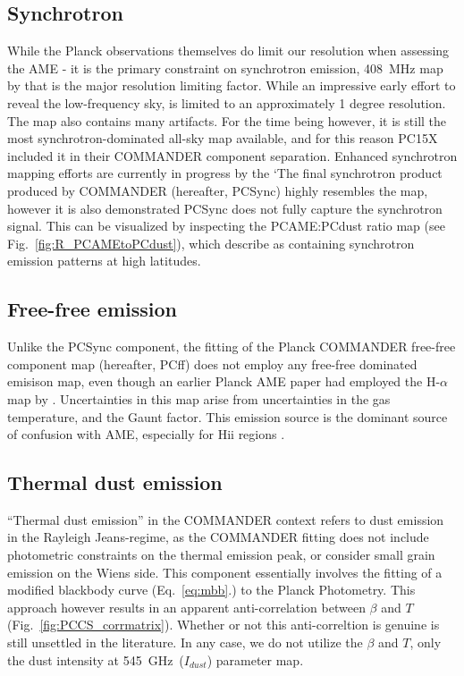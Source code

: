        \subsection{Synchrotron}
        While the Planck observations themselves do limit our resolution when assessing the AME - it is the primary constraint on synchrotron emission, 408~MHz map by \cite{haslam82} that is the major resolution limiting factor. While an impressive early effort to reveal the low-frequency sky, \citep{haslam82} is limited to an approximately 1 degree resolution. The map also contains many artifacts. For the time being however, it is still the most synchrotron-dominated all-sky map available, and for this reason PC15X included it in their COMMANDER component separation. Enhanced synchrotron mapping efforts are currently in progress by the `The final synchrotron product produced by COMMANDER (hereafter, PCSync) highly resembles the \cite{haslam82} map, however it is also demonstrated PCSync does not fully capture the synchrotron signal. This can be visualized by inspecting the PCAME:PCdust ratio map (see Fig.~\ref{fig:R_PCAMEtoPCdust}), which \cite{hensley16} describe as containing synchrotron emission patterns at high latitudes.


       \subsection{Free-free emission}
        Unlike the PCSync component, the fitting of the Planck COMMANDER free-free component map (hereafter, PCff) does not employ any free-free dominated emisison map, even though an earlier Planck AME paper \citep{planckXV} had employed the H-$\alpha$ map by \cite{wham98}. Uncertainties in this map arise from uncertainties in the gas temperature, and the Gaunt factor. This emission source is the dominant source of confusion with AME, especially for Hii regions \citep{planckXV,planckXII, paladini15}.

      \subsection{Thermal dust emission}
      ``Thermal dust emission'' in the COMMANDER context refers to dust emission in the Rayleigh Jeans-regime, as the COMMANDER fitting does not include photometric constraints on the thermal emission peak, or consider small grain emission on the Wiens side. This component essentially involves the fitting of a modified blackbody curve (Eq.~\ref{eq:mbb}.) to the Planck Photometry. This approach however results in an apparent anti-correlation between $\beta$ and $T$ (Fig.~\ref{fig:PCCS_corrmatrix}). Whether or not this anti-correltion is genuine is still unsettled in the literature. In any case, we do not utilize the $\beta$ and $T$, only the dust intensity at 545~GHz~($I_{dust}$) parameter map.

